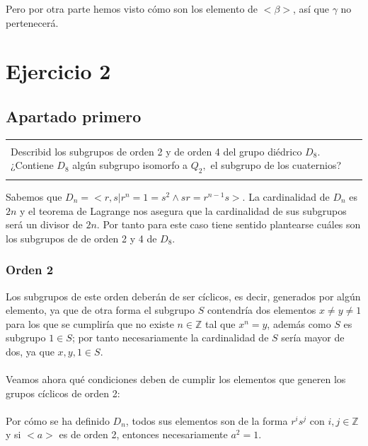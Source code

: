 \documentclass[12pt]{article}
\newenvironment{micaja}
{
    \begin{center}
    \begin{tabular}{|p{0.9\textwidth}|}
    \hline\\
    }   
    {   
    \\\\\hline
    \end{tabular} 
    \end{center}
    }
\begin{document}
Pero por otra parte hemos visto cómo son los elemento de $<\beta>$, así que $\gamma$ no pertenecerá. 


\newpage

\section{Ejercicio 2}

\subsection{Apartado primero}

\begin{micaja}
    Describid los subgrupos de orden 2 y de orden 4 del grupo diédrico $D_8.$
    ¿Contiene $D_8$ algún subgrupo isomorfo a $Q_2,$ el subgrupo de los cuaternios?
\end{micaja}

Sabemos que $D_n = <r,s | r^n = 1 = s^2 \wedge sr = r^{n-1}s>.$
La cardinalidad de $D_n$ es $2n$ y el  teorema de Lagrange nos asegura que la cardinalidad de
sus subgrupos será un divisor de $2n.$ Por tanto para este caso tiene sentido plantearse cuáles son los subgrupos de
de orden 2 y 4 de $D_8.$


\subsubsection*{Orden 2}

Los subgrupos de este orden deberán de ser cíclicos, es decir, generados por algún elemento, 
ya que de otra forma el subgrupo $S$ contendría dos elementos $x \neq y \neq 1$ para los que se cumpliría 
que no existe $n \in \mathbb Z$ tal que $x^n = y$, además como $S$ es subgrupo $1 \in S$; por tanto
necesariamente la cardinalidad de $S$ sería mayor de dos, ya que $x,y,1 \in S.$ \paragraph{}

Veamos ahora qué condiciones deben de cumplir los elementos que generen los grupos cíclicos de orden 2: 
\paragraph*{}
Por cómo se ha definido $D_n$, todos sus elementos son de la forma $r^is^j$ con $i,j \in \mathbb Z$ 
y si $<a>$ es de orden 2, entonces necesariamente $a^2 = 1.$
\end{document}
